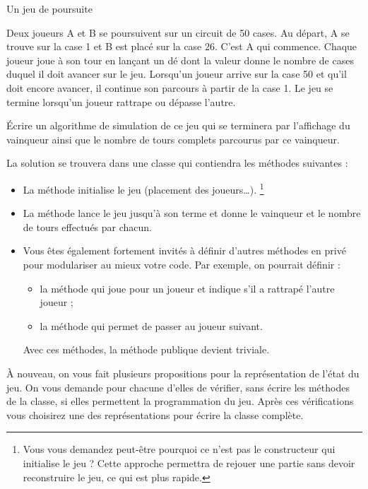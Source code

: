 \begin{Exercice}{Un jeu de poursuite}

	Deux joueurs A et B se poursuivent sur un circuit de 50 cases. 
	Au départ, A se trouve sur la case 1 et B est placé sur la case 26.
	C’est A qui commence. 
	Chaque joueur joue à son tour en lançant un dé dont la valeur 
	donne le nombre de cases duquel il doit avancer sur le jeu. 
	Lorsqu’un joueur arrive sur la case 50 et qu’il doit encore avancer, 
	il continue son parcours à partir de la case 1. 
	Le jeu se termine lorsqu’un joueur rattrape ou dépasse l’autre.

	Écrire un algorithme de simulation de ce jeu
	qui se terminera par l’affichage du vainqueur ainsi que le nombre de
	tours complets parcourus par ce vainqueur. 

	La solution se trouvera dans une classe 
	qui contiendra les méthodes suivantes :
	\begin{itemize}
		\item 
			La méthode  initialise le jeu
			(placement des joueurs\dots).%
			\footnote{%
				Vous vous demandez peut-être pourquoi 
				ce n'est pas le constructeur qui initialise le jeu ?
				Cette approche permettra de rejouer une partie
				sans devoir reconstruire le jeu,
				ce qui est plus rapide.%
			}
		\item 
			La méthode  lance le jeu jusqu’à son terme et
			donne le vainqueur et le nombre de tours effectués par chacun.
		\item 
			Vous êtes également fortement invités à définir d’autres méthodes en
			privé pour modulariser au mieux votre code. 
			Par exemple, on pourrait définir :
			\begin{itemize}
				\item 
					la méthode \og{}\fg{} qui joue pour un joueur et
					indique s'il a rattrapé l’autre joueur ;
				\item 
					la méthode \og{}\fg{} qui permet de passer au
					joueur suivant.
			\end{itemize}
			Avec ces méthodes, la méthode publique \og{}\fg{} 
			devient triviale.
	\end{itemize}

	À nouveau, on vous fait plusieurs propositions pour la représentation
	de l'état du jeu.
	On vous demande pour chacune d'elles de vérifier, 
	sans écrire les méthodes de la classe, 
	si elles permettent la programmation du jeu. 
	Après ces vérifications vous choisirez 
	une des représentations pour écrire la classe complète.
	

\end{Exercice}
